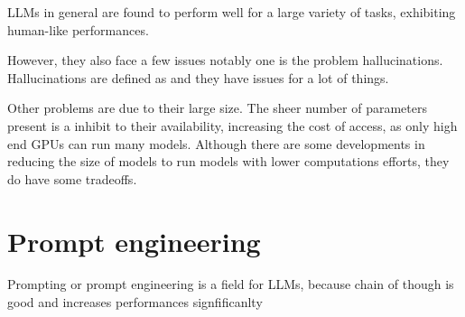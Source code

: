 LLMs in general are found to perform well for a large variety of tasks, exhibiting human-like performances.  

However, they also face a few issues notably one is the problem hallucinations. Hallucinations are defined as  and they have issues for a lot of things.

Other problems are due to their large size. The sheer number of parameters present is a inhibit to their availability, increasing the cost of access, as only high end GPUs can run many models. Although there are some developments in reducing the size of models to run models with lower computations efforts, they do have some tradeoffs. 

\section{Prompt engineering}
Prompting or prompt engineering is a field for LLMs, because chain of though is good and increases performances signfificanlty

